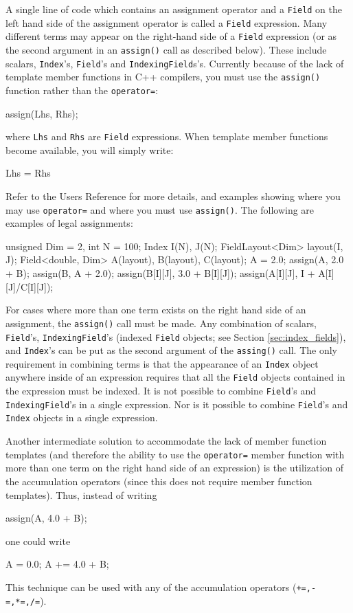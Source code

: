 A single line of code which contains an assignment operator and a \texttt{Field} on the left hand side of the assignment operator is called a \texttt{Field} expression. Many different terms may appear on the right-hand side of a \texttt{Field} expression (or as the second argument in an \texttt{assign()} call as described below). These include scalars, \texttt{Index}'s, \texttt{Field}'s and \texttt{IndexingField}s's. Currently because of the lack of template member functions in
C++ compilers, you must use the \texttt{assign()} function rather than the
\texttt{operator=}:
\begin{smallcode}
assign(Lhs, Rhs);
\end{smallcode}
where \texttt{Lhs} and \texttt{Rhs} are \texttt{Field} expressions. When template member functions become available, you will simply write:
\begin{smallcode}
Lhs = Rhs
\end{smallcode}

Refer to the \ippl Users Reference for more details, and examples showing where you may use \texttt{operator=} and where you must use \texttt{assign()}. The following are examples of legal assignments:\\
\begin{code}
unsigned Dim = 2, int N = 100;
Index I(N), J(N);
FieldLayout<Dim> layout(I, J);
Field<double, Dim> A(layout), B(layout), C(layout);
A = 2.0;
assign(A, 2.0 + B);
assign(B, A + 2.0);
assign(B[I][J], 3.0 + B[I][J]);
assign(A[I][J], I + A[I][J]/C[I][J]);
\end{code}

For cases where more than one term exists on the right hand side of an assignment, the \texttt{assign()} call must be made. Any combination of scalars, \texttt{Field}'s, \texttt{IndexingField}'s (indexed \texttt{Field} objects; see Section \ref{sec:index_fields}), and \texttt{Index}'s can be put as the second argument of the \texttt{assing()} call. The only requirement in combining terms is that the appearance of an \texttt{Index} object anywhere inside of an expression requires that all the \texttt{Field} objects contained in the expression must be indexed. It
is not possible to combine \texttt{Field}'s and \texttt{IndexingField}'s in a single expression. Nor is it possible to combine \texttt{Field}'s and \texttt{Index} objects in a single expression.

Another intermediate solution to accommodate the lack of member function templates (and therefore the ability to use the \texttt{operator=} member function with more than one term on the right hand side of an expression) is the utilization of the accumulation operators (since this does not require member function templates). Thus, instead of writing
\begin{smallcode}
assign(A, 4.0 + B);
\end{smallcode}
one could write
\begin{smallcode}
A = 0.0;
A += 4.0 + B;
\end{smallcode}
This technique can be used with any of the accumulation operators (\texttt{+=,-=,*=,/=}).

